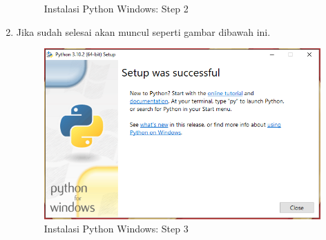 \begin{enumerate}
\begin{figure}[H]
        \caption{Instalasi Python Windows: Step 2}
\end{figure}
\item Jika sudah selesai akan muncul seperti gambar dibawah ini.
\begin{figure}[H]
        \centerline{\includegraphics[scale=0.75]{figures/instalasi-python-windows/step3}}
        \caption{Instalasi Python Windows: Step 3}
\end{figure}
\end{enumerate}

